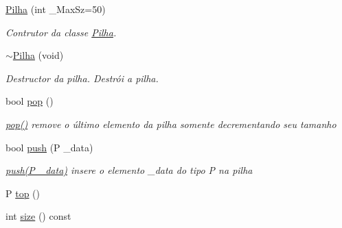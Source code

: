 \begin{DoxyCompactItemize}
\item 
\hyperlink{class_pilha_a433b65de2c6f25af62ab51d42b3b92dc}{Pilha} (int \-\_\-\-Max\-Sz=50)
\begin{DoxyCompactList}\small\item\em Contrutor da classe \hyperlink{class_pilha}{Pilha}. \end{DoxyCompactList}\item 
\hypertarget{class_pilha_acc8583fc419e87f63e6e7a002b8606d4}{\hyperlink{class_pilha_acc8583fc419e87f63e6e7a002b8606d4}{$\sim$\-Pilha} (void)}\label{class_pilha_acc8583fc419e87f63e6e7a002b8606d4}

\begin{DoxyCompactList}\small\item\em Destructor da pilha. Destrói a pilha. \end{DoxyCompactList}\item 
bool \hyperlink{class_pilha_ac173c7a487eb5f86c64420f349dba129}{pop} ()
\begin{DoxyCompactList}\small\item\em \hyperlink{class_pilha_ac173c7a487eb5f86c64420f349dba129}{pop()} remove o último elemento da pilha somente decrementando seu tamanho \end{DoxyCompactList}\item 
bool \hyperlink{class_pilha_a8df80c74ffbfaa8358818d7604c45586}{push} (P \-\_\-data)
\begin{DoxyCompactList}\small\item\em \hyperlink{class_pilha_a8df80c74ffbfaa8358818d7604c45586}{push(\-P \-\_\-data)} insere o elemento \-\_\-data do tipo P na pilha \end{DoxyCompactList}\item 
P \hyperlink{class_pilha_a9e8729b417d0c303a06d8efa0cc7f8b5}{top} ()
\item 
\hypertarget{class_pilha_a0be3922eb0539ff4d010c1b41e196f80}{int \hyperlink{class_pilha_a0be3922eb0539ff4d010c1b41e196f80}{size} () const }\label{class_pilha_a0be3922eb0539ff4d010c1b41e196f80}


\end{DoxyCompactItemize}
